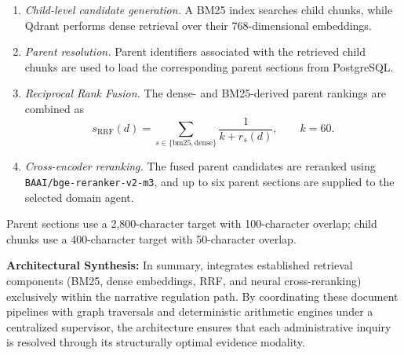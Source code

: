 \begin{enumerate}
    \item \emph{Child-level candidate generation.}
    A BM25 index searches child chunks, while Qdrant performs dense retrieval
    over their 768-dimensional embeddings.

    \item \emph{Parent resolution.}
    Parent identifiers associated with the retrieved child chunks are used to
    load the corresponding parent sections from PostgreSQL.

    \item \emph{Reciprocal Rank Fusion.}
    The dense- and BM25-derived parent rankings are combined as
    \[
        s_{\mathrm{RRF}}(d)
        = \sum_{s\in\{\mathrm{bm25},\mathrm{dense}\}}
          \frac{1}{k+r_s(d)}, \qquad k=60.
    \]

    \item \emph{Cross-encoder reranking.}
    The fused parent candidates are reranked using
    \texttt{BAAI/bge-reranker-v2-m3}, and up to six parent sections are
    supplied to the selected domain agent.
\end{enumerate}

Parent sections use a 2,800-character target with 100-character overlap;
child chunks use a 400-character target with 50-character overlap.

\textbf{Architectural Synthesis:} In summary, \system{} integrates established retrieval components (BM25, dense embeddings, RRF, and neural cross-reranking) exclusively within the narrative regulation path. By coordinating these document pipelines with graph traversals and deterministic arithmetic engines under a centralized supervisor, the architecture ensures that each administrative inquiry is resolved through its structurally optimal evidence modality.
